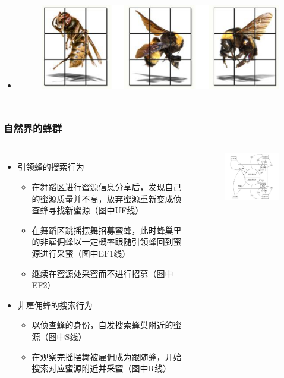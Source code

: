 \begin{frame}
\begin{columns}
\begin{itemize}
\begin{figure}[htbp]
				\end{figure}
			\item[ ] 
				\begin{figure}[htbp]
					\centering
					\includegraphics[scale=0.5]{pic/bee3.png}
				\end{figure}
		\end{itemize}
	\end{columns}
\end{frame}


\begin{frame}
	\frametitle{自然界的蜂群}
	\begin{columns}
		\begin{itemize}
			\item {引领蜂的搜索行为}
				\begin{itemize}
					\item {在舞蹈区进行蜜源信息分享后，发现自己的蜜源质量并不高，放弃蜜源重新变成侦查蜂寻找新蜜源（图中UF线）}
					\item {在舞蹈区跳摇摆舞招募蜜蜂，此时蜂巢里的非雇佣蜂以一定概率跟随引领蜂回到蜜源进行采蜜（图中EF1线）}
					\item {继续在蜜源处采蜜而不进行招募（图中EF2）}
				\end{itemize}
			\item {非雇佣蜂的搜索行为}
				\begin{itemize}
					\item {以侦查蜂的身份，自发搜索蜂巢附近的蜜源（图中S线）}
					\item {在观察完摇摆舞被雇佣成为跟随蜂，开始搜索对应蜜源附近并采蜜（图中R线）}
				\end{itemize}
		\end{itemize}
		\begin{figure}[htbp]
			\centering
			\includegraphics[width=6cm]{pic/bee4.jpg}
		\end{figure}
	\end{columns}
\end{frame}



